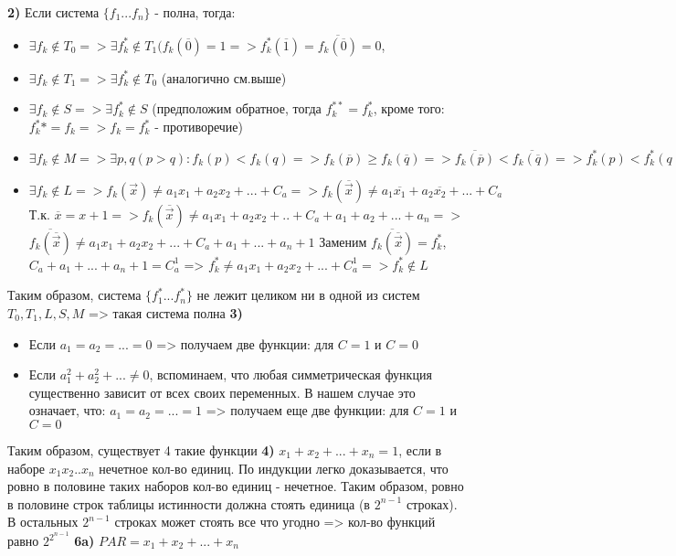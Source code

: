 \documentclass[12pt,a4paper,fleqn]{article}
\begin{document}
{\bf 2)} Если система $\{f_1 ... f_n\}$ - полна, тогда: 
\begin{itemize}
\item $\exists f_k \notin T_0 => \exists f_k^* \notin T_1 (f_k(\overline{0}) = 1 => f_k^*(\overline{1}) = \overline{f_k(\overline{0})} = 0$, 
\item $\exists f_k \notin T_1 => \exists f_k^* \notin T_0$ (аналогично см.выше) 
\item $\exists f_k \notin S => \exists f_k^* \notin S$ (предположим обратное, тогда $f_k^{**} = f_k^*$, кроме того: $f_k^** = f_k => f_k = f_k^*$ - противоречие) 
\item $\exists f_k \notin M => \exists p, q (p > q): f_k(p) < f_k(q) => f_k(\overline{p}) \geqslant f_k(\overline{q}) => \overline{f_k(\overline{p})} < \overline{f_k(\overline{q})} = > f_k^*(p) < f_k^*(q) => f_k^* \notin M$
\item $\exists f_k \notin L => f_k(\vec{x}) \neq a_1x_1 + a_2x_2 + ... + C_a => f_k(\overline{\vec{x}}) \neq a_1\overline{x_1} + a_2\overline{x_2} + ... + C_a$ \newline
Т.к. $\overline{x} = x + 1 => f_k(\overline{\vec{x}}) \neq a_1x_1 + a_2x_2 + .. + C_a + a_1 + a_2 + ...  + a_n =>$ \newline
$\overline{f_k(\overline{\vec{x}})} \neq a_1x_1 + a_2x_2 + ... + C_a + a_1 + ... + a_n + 1$ \newline
Заменим $\overline{f_k(\overline{\vec{x}})} = f_k^*$, $C_a + a_1 + ... + a_n + 1 = C_a^1$ => \newline
$f_k^* \neq a_1x_1 + a_2x_2 + ... + C_a^1 => f_k^* \notin L$
\end{itemize} 
Таким образом, система $\{f_1^*...f_n^*\}$ не лежит целиком ни в одной из систем  $T_0, T_1, L, S, M$ => такая система полна \newline
{\bf 3)} 
\begin{itemize}
\item Если $a_1 = a_2 = ... = 0 $ => получаем две функции: для $C = 1$ и $C = 0$
\item Если $a_1^2 + a_2^2 + ... \neq 0$, вспоминаем, что любая симметрическая функция существенно зависит от всех своих переменных. В нашем случае это означает, что: $a_1 = a_2 = ... = 1$ => получаем еще две функции: для $C = 1$ и $C = 0$
\end{itemize}
Таким образом, существует 4 такие функции \newline
{\bf 4)} $x_1 + x_2 + ... + x_n = 1$,  если в наборе $x_1x_2..x_n$ нечетное кол-во единиц. По индукции легко доказывается, что ровно в половине таких наборов кол-во единиц - нечетное. Таким образом, ровно в половине строк таблицы истинности должна стоять единица (в $2^{n-1}$ строках). В остальных $2^{n-1}$ строках может стоять все что угодно => кол-во функций равно $2^{2^{n-1}}$\newline
{\bf 6a)} $PAR = x_1 + x_2 + ... + x_n$
\end{document}
